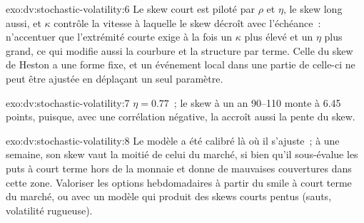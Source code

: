 \begin{solution}{exo:dv:stochastic-volatility:6}
Le skew court est piloté par $\rho$ et $\eta$, le skew long aussi, et $\kappa$ contrôle la vitesse à laquelle le skew décroît avec
l'échéance~: n'accentuer que l'extrémité courte exige à la fois un $\kappa$ plus élevé et un $\eta$ plus grand, ce qui modifie aussi la
courbure et la structure par terme. Celle du skew de Heston a une forme fixe, et un événement local dans une partie de
celle-ci ne peut être ajustée en déplaçant un seul paramètre.
\end{solution}

\begin{solution}{exo:dv:stochastic-volatility:7}
$\eta=0.77$~; le skew à un an 90--110 monte à 6.45 points, puisque, avec une corrélation négative, la  accroît aussi la pente du skew.
\end{solution}

\begin{solution}{exo:dv:stochastic-volatility:8}
Le modèle a été calibré là où il s'ajuste~; à une semaine, son skew vaut la moitié de celui du marché, si bien qu'il sous-évalue les
puts à court terme hors de la monnaie et donne de mauvaises couvertures dans cette zone. Valoriser les options hebdomadaires à partir du smile à court terme du marché, ou
avec un modèle qui produit des skews courts pentus (sauts, volatilité rugueuse).
\end{solution}

